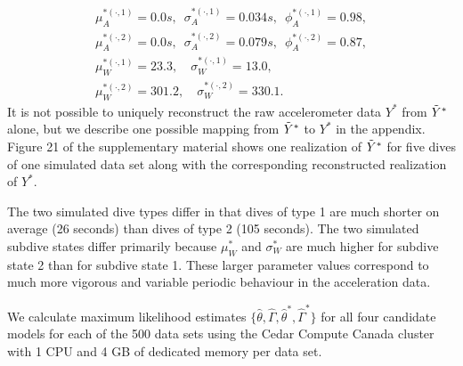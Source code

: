 %
\begin{gather*}
    \mu_A^{*(\cdot,1)} = 0.0 s, \enspace \sigma_A^{*(\cdot,1)} = 0.034s, \enspace \phi_A^{*(\cdot,1)} = 0.98, \\
    \mu_A^{*(\cdot,2)} = 0.0 s, \enspace \sigma_A^{*(\cdot,2)} = 0.079s, \enspace \phi_A^{*(\cdot,2)} = 0.87, \\
    \mu_W^{*(\cdot,1)} = 23.3, \quad \sigma_W^{*(\cdot,1)} = 13.0, \\
    \mu_W^{*(\cdot,2)} = 301.2, \quad \sigma_W^{*(\cdot,2)} = 330.1.
\end{gather*}
%
It is not possible to uniquely reconstruct the raw accelerometer data $Y^*$ from $\tilde{Y}^*$ alone, but we describe one possible mapping from $\tilde{Y}^*$ to $Y^*$ in the appendix. Figure 21 of the supplementary material shows one realization of $\tilde{Y}^*$ for five dives of one simulated data set along with the corresponding reconstructed realization of $Y^*$. 

The two simulated dive types differ in that dives of type 1 are much shorter on average (26 seconds) than dives of type 2 (105 seconds). The two simulated subdive states differ primarily because $\mu_W^*$ and $\sigma_W^*$ are much higher for subdive state 2 than for subdive state 1. These larger parameter values correspond to much more vigorous and variable periodic behaviour in the acceleration data. 

We calculate maximum likelihood estimates $\{\hat \theta, \hat \Gamma, \hat \theta^*, \hat \Gamma^*\}$ for all four candidate models for each of the 500 data sets using the Cedar Compute Canada cluster with 1 CPU and 4 GB of dedicated memory per data set.

